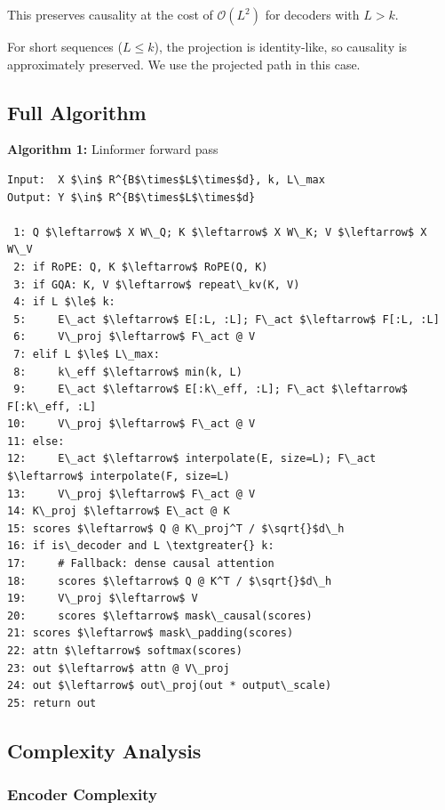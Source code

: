 This preserves causality at the cost of $\mathcal{O}(L^2)$ for decoders 
with $L > k$.

For short sequences ($L \leq k$), the projection is identity-like, so 
causality is approximately preserved. We use the projected path in this 
case.

\subsection{Full Algorithm}

\textbf{Algorithm 1:} Linformer forward pass
\begin{lstlisting}
Input:  X $\in$ R^{B$\times$L$\times$d}, k, L\_max
Output: Y $\in$ R^{B$\times$L$\times$d}

 1: Q $\leftarrow$ X W\_Q; K $\leftarrow$ X W\_K; V $\leftarrow$ X W\_V
 2: if RoPE: Q, K $\leftarrow$ RoPE(Q, K)
 3: if GQA: K, V $\leftarrow$ repeat\_kv(K, V)
 4: if L $\le$ k:
 5:     E\_act $\leftarrow$ E[:L, :L]; F\_act $\leftarrow$ F[:L, :L]
 6:     V\_proj $\leftarrow$ F\_act @ V
 7: elif L $\le$ L\_max:
 8:     k\_eff $\leftarrow$ min(k, L)
 9:     E\_act $\leftarrow$ E[:k\_eff, :L]; F\_act $\leftarrow$ F[:k\_eff, :L]
10:     V\_proj $\leftarrow$ F\_act @ V
11: else:
12:     E\_act $\leftarrow$ interpolate(E, size=L); F\_act $\leftarrow$ interpolate(F, size=L)
13:     V\_proj $\leftarrow$ F\_act @ V
14: K\_proj $\leftarrow$ E\_act @ K
15: scores $\leftarrow$ Q @ K\_proj^T / $\sqrt{}$d\_h
16: if is\_decoder and L \textgreater{} k:
17:     # Fallback: dense causal attention
18:     scores $\leftarrow$ Q @ K^T / $\sqrt{}$d\_h
19:     V\_proj $\leftarrow$ V
20:     scores $\leftarrow$ mask\_causal(scores)
21: scores $\leftarrow$ mask\_padding(scores)
22: attn $\leftarrow$ softmax(scores)
23: out $\leftarrow$ attn @ V\_proj
24: out $\leftarrow$ out\_proj(out * output\_scale)
25: return out
\end{lstlisting}

\subsection{Complexity Analysis}

\subsubsection{Encoder Complexity}

